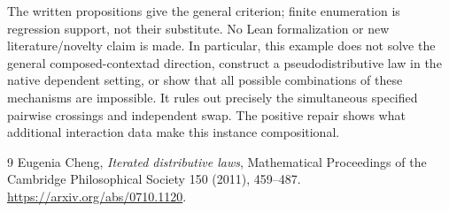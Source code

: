 \documentclass[11pt]{article}
\begin{document}
The written propositions give the general criterion; finite enumeration is
regression support, not their substitute. No Lean formalization or new
literature/novelty claim is made. In particular, this example does not solve
the general composed-contextad direction, construct a pseudodistributive
law in the native dependent setting, or show that all possible combinations
of these mechanisms are impossible. It rules out precisely the simultaneous
specified pairwise crossings and independent swap. The positive repair
shows what additional interaction data make this instance compositional.

\begin{thebibliography}{9}
 Eugenia Cheng, \emph{Iterated distributive laws},
Mathematical Proceedings of the Cambridge Philosophical Society 150 (2011),
459--487. \url{https://arxiv.org/abs/0710.1120}.
\end{thebibliography}
\end{document}
